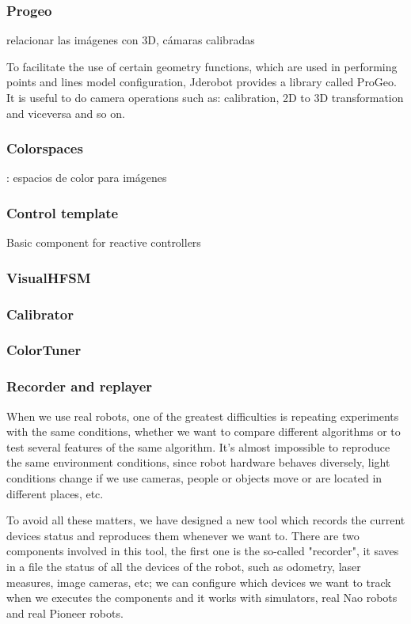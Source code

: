 \documentclass[twocolumn]{svjour3}          %
\begin{document}
\subsubsection{Progeo}

relacionar las imágenes con 3D, cámaras calibradas 

To facilitate the use of certain geometry functions, which are used in performing points and lines model configuration, Jderobot provides a library called ProGeo. It is useful to do camera operations such as: calibration, 2D to 3D transformation and viceversa and so on.

\subsubsection{Colorspaces}: espacios de color para imágenes

\subsubsection{Control template}
Basic component for reactive controllers



\subsubsection{VisualHFSM}
\subsubsection{Calibrator}
\subsubsection{ColorTuner}
\subsubsection{Recorder and replayer}

When we use real robots, one of the greatest difficulties is repeating experiments with the same conditions, whether we want to compare different algorithms or to test several features of the same algorithm. It's almost impossible to reproduce the same environment conditions, since robot hardware behaves diversely, light conditions change if we use cameras, people or objects move or are located in different places, etc.

To avoid all these matters, we have designed a new tool which records the current devices status and reproduces them whenever we want to. There are two components involved in this tool, the first one is the so-called "recorder", it saves in a file the status of all the devices of the robot, such as odometry, laser measures, image cameras, etc; we can configure which devices we want to track when we executes the components and it works with simulators, real Nao robots and real Pioneer robots.
\end{document}
